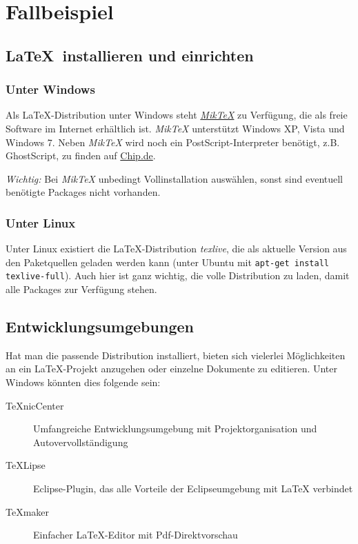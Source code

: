\chapter{Fallbeispiel}

\section{\LaTeX\ installieren und einrichten}
\subsection{Unter Windows}

Als LaTeX-Distribution unter Windows steht \href{http://www.miktex.org/}{\textit{MikTeX}} zu Verfügung, die als freie Software im Internet erhältlich ist. 
\textit{MikTeX} unterstützt Windows XP, Vista und Windows 7. Neben \textit{MikTeX} wird noch ein PostScript-Interpreter benötigt, 
z.B. GhostScript, zu finden auf \href{http://www.chip.de}{Chip.de}.

\textit{Wichtig:} Bei \textit{MikTeX} unbedingt Vollinstallation auswählen, sonst sind eventuell benötigte Packages nicht vorhanden.

\subsection{Unter Linux}

Unter Linux existiert die LaTeX-Distribution \textit{texlive}, die als aktuelle Version aus den Paketquellen geladen werden kann (unter Ubuntu mit 
\lstinline{apt-get install texlive-full}). Auch hier ist ganz wichtig, die volle Distribution zu laden, damit alle Packages zur Verfügung stehen.

\section{Entwicklungsumgebungen}

Hat man die passende Distribution installiert, bieten sich vielerlei Möglichkeiten an ein LaTeX-Projekt anzugehen oder einzelne Dokumente zu editieren. Unter
Windows könnten dies folgende sein:

\begin{description}
	\item [TeXnicCenter] Umfangreiche Entwicklungsumgebung mit Projektorganisation und Autovervollständigung
	\item [TeXLipse] Eclipse-Plugin, das alle Vorteile der Eclipseumgebung mit LaTeX verbindet
	\item [TeXmaker] Einfacher LaTeX-Editor mit Pdf-Direktvorschau
\end{description}



